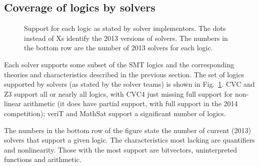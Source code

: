 \documentclass[smallcondensed]{svjour3}
\begin{document}

\subsection{Coverage of logics by solvers}
\label{Coverage}

\begin{figure}
\centering

\caption{Support for each logic as stated by solver implementors. The dots instead of Xs identify the 2013 versions of solvers. The numbers in the bottom row are the number of 2013 solvers for each logic.}
\label{Fig:solversupport}
\end{figure}

Each solver supports some subset of the SMT logics and the corresponding theories and characteristics described in the previous section. The set of logics supported by solvers (as stated by the solver teams) is shown in Fig.~\ref{Fig:solversupport}. CVC and Z3 support all or nearly all logics, with CVC4 just missing full support for non-linear arithmetic (it does have partial support, with full support in the 2014 competition); veriT and MathSat support a significant number of logics.

The numbers in the bottom row of the figure state the number of current (2013) solvers that support a given logic. The characteristics most lacking are quantifiers and nonlinearity. Those with the most support are bitvectors, uninterpreted functions and arithmetic.
\end{document}
